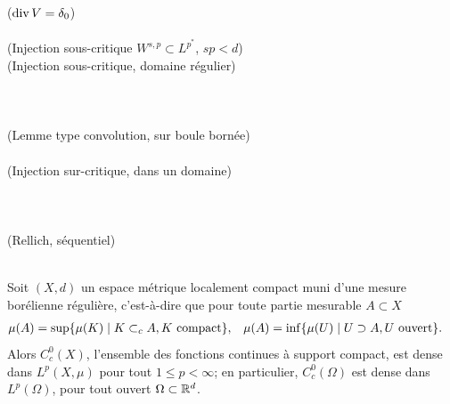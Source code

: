 {\\
\\
 ($\operatorname{div} V = \delta_0$)\\
\\
 (Injection sous-critique $W^{s,p} \subset L^{p^*}$, $sp<d$)\\
 (Injection sous-critique, domaine régulier)\\
\\
\\

\\
 (Lemme type convolution, sur boule bornée)\\
\\
 (Injection sur-critique, dans un domaine)\\

\\
\\
\\
 (Rellich, séquentiel)\\
\\
}


\begin{proposition}	
\label{prop:densC0Lp}
%
Soit $(X,d)$ un espace métrique localement compact muni d'une mesure borélienne régulière, c'est-à-dire que pour toute partie mesurable $A \subset X$
\begin{align}
\label{eqdef:mes_reguliere}
	\mu(A) &= \sup\{\mu(K) \mid K \subset_c A, K \text{ compact}\}, &
	\mu(A) &= \inf\{\mu(U) \mid U \supset A, U \text{ ouvert}\}.
\end{align}
Alors $C^0_c(X)$, l'ensemble des fonctions continues à support compact, est dense dans $L^p(X,\mu)$ pour tout $1 \leq p < \infty$; 
en particulier, $C^0_c(\Omega)$ est dense dans $L^p(\Omega)$, pour tout ouvert $\Omega \subset \mathbb{R}^d$.
\end{proposition}


